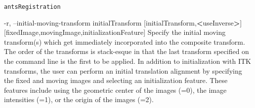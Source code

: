 \documentclass[ignorenonframetext,]{beamer}
\newenvironment{Shaded}{\begin{snugshade}}{\end{snugshade}}
\newcommand{\FunctionTok}[1]{\textcolor[rgb]{0.00,0.00,0.00}{#1}}
\newcommand{\OperatorTok}[1]{\textcolor[rgb]{0.81,0.36,0.00}{\textbf{#1}}}
\newcommand{\ExtensionTok}[1]{#1}
\newcommand{\NormalTok}[1]{#1}
\begin{document}
\begin{frame}[fragile]{\texttt{antsRegistration}}
\begin{Shaded}
\begin{Highlighting}[]
     \ExtensionTok{-r}\NormalTok{, --initial-moving-transform initialTransform}
\NormalTok{                                    [}\ExtensionTok{initialTransform}\NormalTok{,}\OperatorTok{<}\NormalTok{useInverse}\OperatorTok{>}\NormalTok{]}
\NormalTok{                                    [}\ExtensionTok{fixedImage}\NormalTok{,movingImage,initializationFeature]}
          \ExtensionTok{Specify}\NormalTok{ the initial moving transform(s) }\FunctionTok{which}\NormalTok{ get immediately incorporated into}
          \ExtensionTok{the}\NormalTok{ composite transform. The order of the transforms is stack-esque in that the}
          \FunctionTok{last}\NormalTok{ transform specified on the command line is the first to be applied. In}
          \ExtensionTok{addition}\NormalTok{ to initialization with ITK transforms, the user can perform an initial}
          \ExtensionTok{translation}\NormalTok{ alignment by specifying the fixed and moving images and selecting an}
          \ExtensionTok{initialization}\NormalTok{ feature. These features include using the geometric center of the}
          \ExtensionTok{images}\NormalTok{ (=0), }\ExtensionTok{the}\NormalTok{ image intensities (=1), }\ExtensionTok{or}\NormalTok{ the origin of the images (=2)}\ExtensionTok{.}


\end{Highlighting}
\end{Shaded}
\end{frame}
\end{document}
